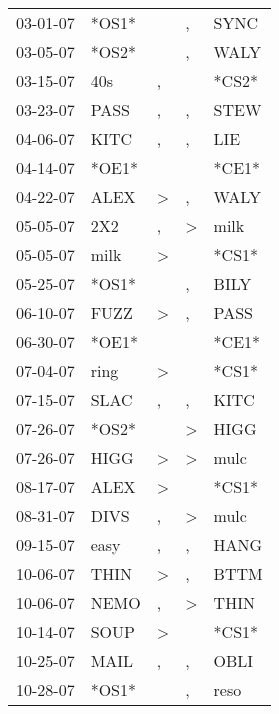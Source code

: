 \begin{supertabular}{lllll}
 03-01-07 &  *OS1* &                  &                , &   SYNC \\
 03-05-07 &  *OS2* &                  &                , &   WALY \\
 03-15-07 &    40s &                , &                  &  *CS2* \\
 03-23-07 &   PASS &                , &                , &   STEW \\
 04-06-07 &   KITC &                , &                , &    LIE \\
 04-14-07 &  *OE1* &                  &                  &  *CE1* \\
 04-22-07 &   ALEX &     \textgreater &                , &   WALY \\
 05-05-07 &    2X2 &                , &     \textgreater &   milk \\
 05-05-07 &   milk &     \textgreater &                  &  *CS1* \\
 05-25-07 &  *OS1* &                  &                , &   BILY \\
 06-10-07 &   FUZZ &     \textgreater &                , &   PASS \\
 06-30-07 &  *OE1* &                  &                  &  *CE1* \\
 07-04-07 &   ring &     \textgreater &                  &  *CS1* \\
 07-15-07 &   SLAC &                , &                , &   KITC \\
 07-26-07 &  *OS2* &                  &     \textgreater &   HIGG \\
 07-26-07 &   HIGG &     \textgreater &     \textgreater &   mulc \\
 08-17-07 &   ALEX &     \textgreater &                  &  *CS1* \\
 08-31-07 &   DIVS &                , &     \textgreater &   mulc \\
 09-15-07 &   easy &                , &                , &   HANG \\
 10-06-07 &   THIN &     \textgreater &                , &   BTTM \\
 10-06-07 &   NEMO &                , &     \textgreater &   THIN \\
 10-14-07 &   SOUP &     \textgreater &                  &  *CS1* \\
 10-25-07 &   MAIL &                , &                , &   OBLI \\
 10-28-07 &  *OS1* &                  &                , &   reso \\

\end{supertabular}

